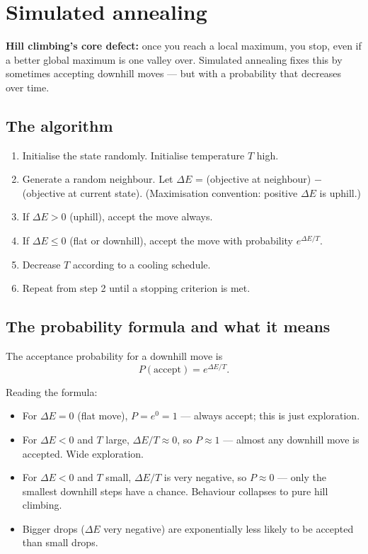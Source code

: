 \documentclass[11pt, a4paper]{article}
\begin{document}
\section{Simulated annealing}

\textbf{Hill climbing's core defect:} once you reach a local maximum, you stop, even if a better global maximum is one valley over. Simulated annealing fixes this by sometimes accepting downhill moves — but with a probability that decreases over time.

\subsection{The algorithm}

\begin{defbox}
\begin{enumerate}
  \item Initialise the state randomly. Initialise temperature $T$ high.
  \item Generate a random neighbour. Let $\Delta E$ = (objective at neighbour) $-$ (objective at current state). (Maximisation convention: positive $\Delta E$ is uphill.)
  \item If $\Delta E > 0$ (uphill), accept the move always.
  \item If $\Delta E \le 0$ (flat or downhill), accept the move with probability $e^{\Delta E / T}$.
  \item Decrease $T$ according to a cooling schedule.
  \item Repeat from step 2 until a stopping criterion is met.
\end{enumerate}
\end{defbox}

\subsection{The probability formula and what it means}

The acceptance probability for a downhill move is
\[
P(\text{accept}) = e^{\Delta E / T}.
\]

Reading the formula:

\begin{itemize}
  \item For $\Delta E = 0$ (flat move), $P = e^0 = 1$ — always accept; this is just exploration.
  \item For $\Delta E < 0$ and $T$ large, $\Delta E / T \approx 0$, so $P \approx 1$ — almost any downhill move is accepted. Wide exploration.
  \item For $\Delta E < 0$ and $T$ small, $\Delta E / T$ is very negative, so $P \approx 0$ — only the smallest downhill steps have a chance. Behaviour collapses to pure hill climbing.
  \item Bigger drops ($\Delta E$ very negative) are exponentially less likely to be accepted than small drops.
\end{itemize}
\end{document}
